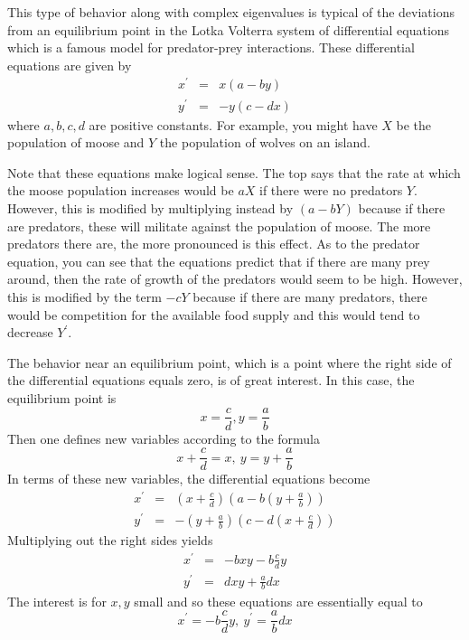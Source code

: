 This type of behavior along with complex eigenvalues is typical of the
deviations from an equilibrium point in the Lotka Volterra system of
differential equations which is a famous model for predator-prey
interactions. These differential equations are given by
\begin{eqnarray*}
x^{\prime } &=&x\left( a-by\right) \\
y^{\prime } &=&-y\left( c-dx\right)
\end{eqnarray*}
where $a,b,c,d$ are positive constants. For example, you might have $X$ be
the population of moose and $Y$ the population of wolves on an island.

Note that these equations make logical sense. The top says that the rate at which
the moose population increases would be $aX$ if there were no predators $Y$.
However, this is modified by multiplying instead by $\left( a-bY\right) $
because if there are predators, these will militate against the population
of moose.  The more predators there
are, the more pronounced is this effect. As to the predator equation, you
can see that the equations predict that if there are many prey around, then
the rate of growth of the predators would seem to be high. However, this is
modified by the term $-cY$ because if there are many predators, there would
be competition for the available food supply and this would tend to decrease
$Y^{\prime }.$

The behavior near an equilibrium point, which is a point where the right
side of the differential equations equals zero, is of great interest. In
this case, the equilibrium point is
\begin{equation*}
x=\frac{c}{d}, y=\frac{a}{b}
\end{equation*}
Then one defines new variables according to the formula
\begin{equation*}
x+\frac{c}{d}=x,\ y=y+\frac{a}{b}
\end{equation*}
In terms of these new variables, the differential equations become
\begin{eqnarray*}
x^{\prime } &=&\left( x+\frac{c}{d}\right) \left( a-b\left( y+\frac{a}{b}
\right) \right) \\
y^{\prime } &=&-\left( y+\frac{a}{b}\right) \left( c-d\left( x+\frac{c}{d}
\right) \right)
\end{eqnarray*}
Multiplying out the right sides yields
\begin{eqnarray*}
x^{\prime } &=&-bxy-b\frac{c}{d}y \\
y^{\prime } &=&dxy+\frac{a}{b}dx
\end{eqnarray*}
The interest is for $x,y$ small and so these equations are essentially equal
to
\begin{equation*}
x^{\prime }=-b\frac{c}{d}y,\ y^{\prime }=\frac{a}{b}dx
\end{equation*}


